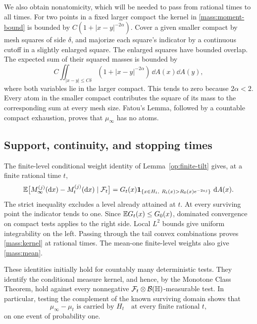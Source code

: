 We also obtain nonatomicity, which will be needed to pass from rational
times to all times.  For two points in a fixed larger compact the kernel
in \eqref{mass:moment-bound} is bounded by
$C(1+|x-y|^{-2\alpha})$.  Cover a given smaller compact by mesh squares
of side $\delta$, and majorize each square's indicator by a continuous
cutoff in a slightly enlarged square.  The enlarged squares have bounded
overlap.  The expected sum of their squared masses is bounded by
\[
 C\iint_{|x-y|\le C\delta}
       (1+|x-y|^{-2\alpha})\,\dd A(x)\dd A(y),
\]
where both variables lie in the larger compact.  This tends to zero
because $2\alpha<2$.  Every atom in the smaller compact contributes the
square of its mass to the corresponding sum at every mesh size.
Fatou's Lemma, followed by a countable compact exhaustion, proves that
$\mu_\infty$ has no atoms.

\subsection{Support, continuity, and stopping times}

The finite-level conditional weight identity of
Lemma~\ref{op:finite-tilt} gives, at a finite rational time $t$,
\begin{equation}
 \mathbb E\bigl[M_\infty^{(j)}(\mathop{}\!\mathrm{d} x)-M_t^{(j)}(\mathop{}\!\mathrm{d} x)
             \mid\mathcal F_t\bigr]
 =G_t(x)\mathbf 1_{\{x\in H_t,\ R_t(x)>R_0(x)e^{-2aj}\}}\,\mathop{}\!\mathrm{d} A(x).
 \label{mass:approx-kernel}
\end{equation}
The strict inequality excludes a level already attained at $t$.
At every surviving point the indicator tends to one.  Since
$\mathbb E G_t(x)\le G_0(x)$, dominated convergence on compact tests applies to
the right side.  Local $L^2$ bounds give uniform integrability on the
left.  Passing through the tail convex combinations proves
\eqref{mass:kernel} at rational times.  The mean-one finite-level weights
also give \eqref{mass:mean}.

These identities initially hold for countably many deterministic tests.
They identify the conditional measure kernel, and hence, by the Monotone
Class Theorem, hold against every nonnegative
$\mathcal F_t\otimes\mathcal B(\mathbb H)$-measurable test.  In particular,
testing the complement of the known surviving domain shows that
\begin{equation}
 \mu_\infty-\mu_t\text{ is carried by }H_t
 \quad\text{at every finite rational }t,
 \label{mass:future-support}
\end{equation}
on one event of probability one.

